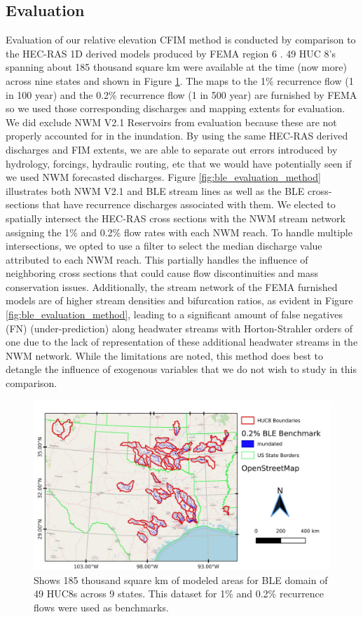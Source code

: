 \subsection{Evaluation}
\label{ssec:evaluation}
%
Evaluation of our relative elevation CFIM method is conducted by comparison to the HEC-RAS 1D derived models produced by FEMA region 6 \cite{fema2021base,fema2021estimated}.
49 HUC 8's spanning about 185 thousand square km were available at the time (now more) across nine states and shown in Figure \ref{fig:all_ble_maps}.
The maps to the 1\% recurrence flow (1 in 100 year) and the 0.2\% recurrence flow (1 in 500 year) are furnished by FEMA so we used those corresponding discharges and mapping extents for evaluation.
We did exclude NWM V2.1 Reservoirs from evaluation because these are not properly accounted for in the inundation.
By using the same HEC-RAS derived discharges and FIM extents, we are able to separate out errors introduced by hydrology, forcings, hydraulic routing, etc that we would have potentially seen if we used NWM forecasted discharges.
Figure \ref{fig:ble_evaluation_method} illustrates both NWM V2.1 and BLE stream lines as well as the BLE cross-sections that have recurrence discharges associated with them.
We elected to spatially intersect the HEC-RAS cross sections with the NWM stream network assigning the 1\% and 0.2\% flow rates with each NWM reach. 
To handle multiple intersections, we opted to use a filter to select the median discharge value attributed to each NWM reach.
This partially handles the influence of neighboring cross sections that could cause flow discontinuities and mass conservation issues.
Additionally, the stream network of the FEMA furnished models are of higher stream densities and bifurcation ratios, as evident in Figure \ref{fig:ble_evaluation_method}, leading to a significant amount of false negatives (FN) (under-prediction) along headwater streams with Horton-Strahler orders of one due to the lack of representation of these additional headwater streams in the NWM network.
While the limitations are noted, this method does best to detangle the influence of exogenous variables that we do not wish to study in this comparison.
%
\begin{figure}[h!]
\centering
\includegraphics[scale=1.0]{figures/all_ble_maps.jpg}
\caption{Shows 185 thousand square km of modeled areas for BLE domain of 49 HUC8s across 9 states. This dataset for 1\% and 0.2\% recurrence flows were used as benchmarks.}
\label{fig:all_ble_maps}
\end{figure}
